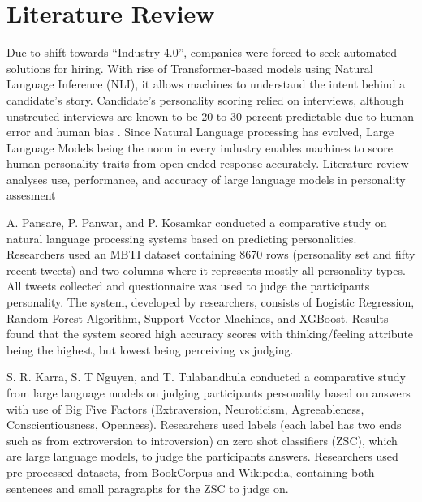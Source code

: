 \section{Literature Review}
\label{sec:Lit}
\par Due to shift towards “Industry 4.0”, companies were forced to seek automated solutions for hiring. With rise of Transformer-based models using Natural Language Inference (NLI), it allows machines to understand the intent behind a candidate’s story. Candidate's personality scoring relied on interviews, although unstrcuted interviews are known to be 20 to 30 percent predictable due to human error and human bias \cite{pansare2022pppkosam}. Since Natural Language processing has evolved, Large Language Models being the norm in every industry enables machines to score human personality traits from open ended response accurately. Literature review analyses use, performance, and accuracy of large language models in personality assesment 

\par A. Pansare, P. Panwar, and P. Kosamkar \cite{pansare2022pppkosam} conducted a comparative study on natural language processing systems based on predicting personalities. Researchers used an MBTI dataset containing 8670 rows (personality set and fifty recent tweets) and two columns where it represents mostly all personality types. All tweets collected and questionnaire was used to judge the participants personality. The system, developed by researchers, consists of Logistic Regression, Random Forest Algorithm, Support Vector Machines, and XGBoost. Results found that the system scored high accuracy scores with thinking/feeling attribute being the highest, but lowest being perceiving vs judging. 

\par S. R. Karra, S. T Nguyen, and T. Tulabandhula \cite{Karra:2022} conducted a comparative study from large language models on judging participants personality based on answers with use of Big Five Factors (Extraversion, Neuroticism, Agreeableness, Conscientiousness, Openness). Researchers used labels (each label has two ends such as from extroversion to introversion) on zero shot classifiers (ZSC), which are large language models, to judge the participants answers. Researchers used pre-processed datasets, from BookCorpus and Wikipedia, containing both sentences and small paragraphs for the ZSC to judge on. 

